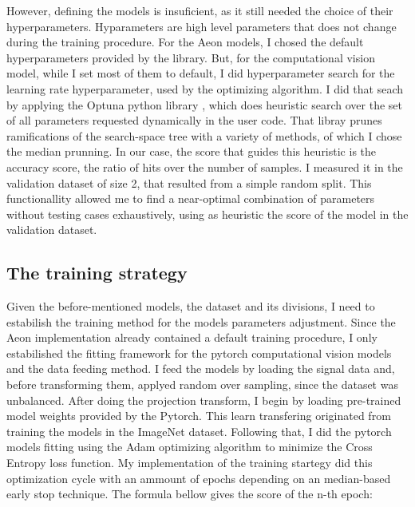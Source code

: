 



However, defining the models is insuficient, as it still needed the choice of their hyperparameters. Hyparameters are high level parameters that does not change during the training procedure. For the Aeon models, I chosed the default hyperparameters provided by the library. But, for the computational vision model, while I set most of them to default, I did hyperparameter search for the learning rate hyperparameter, used by the optimizing algorithm. I did that seach by applying the Optuna python library \cite{OptunaDoc}, which does heuristic search over the set of all parameters requested dynamically in the user code. That libray prunes ramifications of the search-space tree with a variety of methods, of which I chose the median prunning. In our case, the score that guides this heuristic is the accuracy score, the ratio of hits over the number of samples. I measured it in the validation dataset of size 2, that resulted from a simple random split. This functionallity allowed me to find a near-optimal combination of parameters without testing cases exhaustively, using as heuristic the score of the model in the validation dataset.

\subsection{The training strategy}

Given the before-mentioned models, the dataset and its divisions, I need to estabilish the training method for the models parameters adjustment. Since the Aeon implementation already contained a default training procedure, I only estabilished the fitting framework for the pytorch computational vision models and the data feeding method. I feed the models by loading the signal data and, before transforming them, applyed random over sampling, since the dataset was unbalanced. After doing the projection transform, I begin by loading pre-trained model weights provided by the Pytorch. This learn transfering originated from training the models in the ImageNet \cite{ImageNet} dataset. Following that, I did the pytorch models fitting using the Adam optimizing algorithm \cite{Adam} to minimize the Cross Entropy loss function. My implementation of the training startegy did this optimization cycle with an ammount of epochs depending on an median-based early stop technique. The formula bellow gives the score of the n-th epoch:

